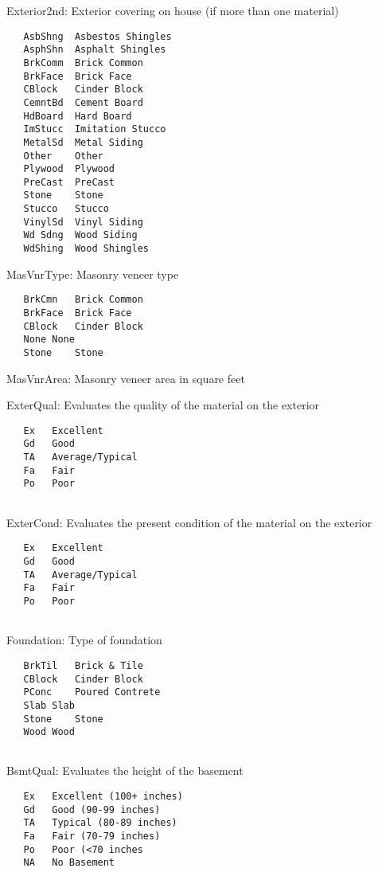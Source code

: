 \documentclass[]{article}
\begin{document}
Exterior2nd: Exterior covering on house (if more than one material)

\begin{verbatim}
   AsbShng  Asbestos Shingles
   AsphShn  Asphalt Shingles
   BrkComm  Brick Common
   BrkFace  Brick Face
   CBlock   Cinder Block
   CemntBd  Cement Board
   HdBoard  Hard Board
   ImStucc  Imitation Stucco
   MetalSd  Metal Siding
   Other    Other
   Plywood  Plywood
   PreCast  PreCast
   Stone    Stone
   Stucco   Stucco
   VinylSd  Vinyl Siding
   Wd Sdng  Wood Siding
   WdShing  Wood Shingles
\end{verbatim}

MasVnrType: Masonry veneer type

\begin{verbatim}
   BrkCmn   Brick Common
   BrkFace  Brick Face
   CBlock   Cinder Block
   None None
   Stone    Stone
\end{verbatim}

MasVnrArea: Masonry veneer area in square feet

ExterQual: Evaluates the quality of the material on the exterior

\begin{verbatim}
   Ex   Excellent
   Gd   Good
   TA   Average/Typical
   Fa   Fair
   Po   Poor
    
\end{verbatim}

ExterCond: Evaluates the present condition of the material on the
exterior

\begin{verbatim}
   Ex   Excellent
   Gd   Good
   TA   Average/Typical
   Fa   Fair
   Po   Poor
    
\end{verbatim}

Foundation: Type of foundation

\begin{verbatim}
   BrkTil   Brick & Tile
   CBlock   Cinder Block
   PConc    Poured Contrete 
   Slab Slab
   Stone    Stone
   Wood Wood
    
\end{verbatim}

BsmtQual: Evaluates the height of the basement

\begin{verbatim}
   Ex   Excellent (100+ inches) 
   Gd   Good (90-99 inches)
   TA   Typical (80-89 inches)
   Fa   Fair (70-79 inches)
   Po   Poor (<70 inches
   NA   No Basement
    
\end{verbatim}
\end{document}
